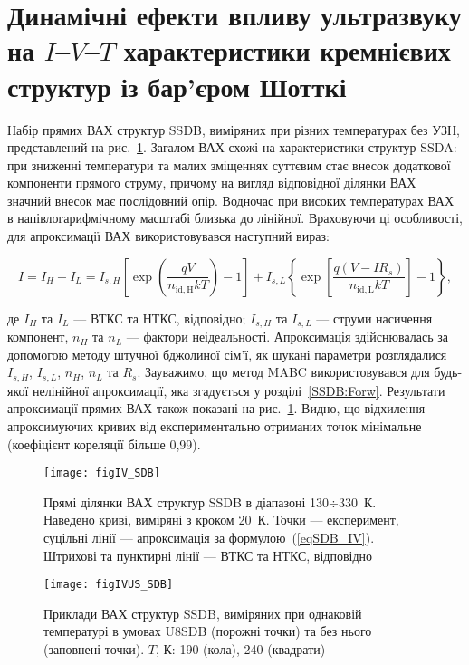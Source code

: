 \section{Динамічні ефекти впливу ультразвуку на $I$--$V$--$T$ характеристики кремнієвих структур із бар'єром Шотткі\label{SSDB:Forw}}


Набір прямих ВАХ структур  SSDB, виміряних при різних температурах без УЗН, представлений на рис.~\ref{figIV_SDB}.
Загалом ВАХ схожі на характеристики структур SSDA:
при зниженні температури та малих зміщеннях суттєвим стає внесок додаткової компоненти прямого струму, причому
на вигляд відповідної ділянки ВАХ значний внесок має послідовний опір.
Водночас при високих температурах ВАХ в напівлогарифмічному масштабі близька до лінійної.
Враховуючи ці особливості, для апроксимації ВАХ використовувався наступний вираз:

\begin{equation}
\label{eqSDB_IV}
  I=I_H+I_L=I_{s,H}\left[\exp\left(\frac{qV}{n_\mathrm{id,H}kT}\right)-1\right]+
 I_{s,L}\left\{\exp\left[\frac{q(V-IR_s)}{n_\mathrm{id,L}kT}\right]-1\right\},
\end{equation}

де
$I_H$ та $I_L$ --- ВТКС та НТКС, відповідно;
$I_{s,H}$ та $I_{s,L}$ --- струми насичення компонент,
$n_{H}$ та $n_{L}$ --- фактори неідеальності.
Апроксимація здійснювалась за допомогою методу штучної бджолиної сім'ї,
як шукані параметри розглядалися $I_{s,H}$, $I_{s,L}$, $n_{H}$, $n_{L}$ та $R_s$.
Зауважимо, що метод MABC використовувався для будь-якої нелінійної апроксимації, яка згадується у розділі~\ref{SSDB:Forw}.
Результати апроксимації прямих ВАХ також показані на рис.~\ref{figIV_SDB}.
Видно, що відхилення апроксимуючих кривих від експериментально отриманих точок мінімальне
(коефіцієнт кореляції більше 0,99).

\begin{figure}
\center
\texttt{[image: figIV\_SDB]}
\caption{\label{figIV_SDB}
Прямі  ділянки ВАХ структур SSDB  в  діапазоні 130$\div$330~К.
Наведено криві, виміряні з кроком 20~К.
Точки --- експеримент,
суцільні лінії --- апроксимація за формулою~(\ref{eqSDB_IV}).
Штрихові та пунктирні лінії --- ВТКС та НТКС, відповідно
}%
\end{figure}

\begin{figure}[b]
\center
\texttt{[image: figIVUS\_SDB]}
\caption{\label{figIVUS_SDB}
Приклади ВАХ структур SSDB, виміряних при однаковій температурі в умовах U8SDB (порожні точки) та без нього (заповнені точки).
$T$, К: 190 (кола), 240 (квадрати)
}%
\end{figure}

